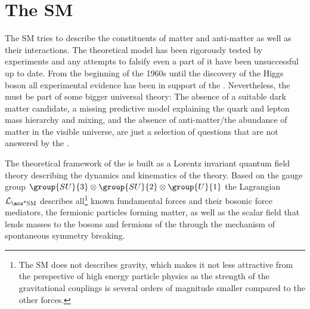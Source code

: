
\section{The \acl*{SM}}
\label{sec:cpv_theory:standard_model}

The \acf{SM} tries to describe the constituents of matter and anti-matter as
well as their interactions. The theoretical model has been rigorously tested by
experiments and any attempts to falsify even a part of it have been unsuccessful
up to date. From the beginning of the 1960s until the discovery of the Higgs
boson \cite{Aad:2015zhl} all experimental evidence has been in support of the
\SM. Nevertheless, the \SM must be part of some bigger universal theory: The
absence of a suitable dark matter candidate, a missing predictive model
explaining the quark and lepton mass hierarchy and mixing, and the absence of
anti-matter/the abundance of matter in the visible universe, are just a
selection of questions that are not answered by the \SM.

The theoretical framework of the \SM is built as a Lorentz invariant quantum
field theory describing the dynamics and kinematics of the theory. Based on the
gauge group $\group{SU}{3}\otimes\group{SU}{2}\otimes\group{U}{1}$ the \SM
Lagrangian $\mathcal{L}_{\text{\acs*{SM}}}$ describes all\footnote{The \ac{SM}
does not describes gravity, which makes it not less attractive from the
perspective of high energy particle physics as the strength of the gravitational
couplings is several orders of magnitude smaller compared to the other forces.}
known fundamental forces and their bosonic force mediators, the fermionic
particles forming matter, as well as the scalar field that lends masses to the
bosons and fermions of the \SM through the mechanism of spontaneous symmetry
breaking.

